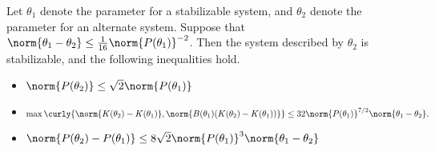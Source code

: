 \begin{lemma}
    \label{lem: Riccati perturbation}
    Let $\theta_1$ denote the parameter for a stabilizable system, and $\theta_2$ denote the parameter for an alternate system. Suppose that $\norm{\theta_1-\theta_2} \leq \frac{1}{16}\norm{P(\theta_1)}^{-2}$. Then the system described by $\theta_2$ is stabilizable, and the following inequalities hold.
    \begin{itemize}
        \item $\norm{P(\theta_2)}\leq \sqrt{2} \norm{P(\theta_1)}$
        \item $\max\curly{\norm{K(\theta_2) - K(\theta_1)}, \norm{B(\theta_1) (K(\theta_2) - K(\theta_1))}
        }\leq  32\norm{P(\theta_1)}^{7/2} \norm{\theta_1-\theta_2}.$
        \item $\norm{P(\theta_2) - P(\theta_1)} \leq 8\sqrt{2}\norm{P(\theta_1)}^3\norm{\theta_1-\theta_2}$
    \end{itemize}
\end{lemma}

